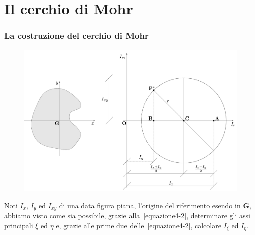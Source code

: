 \clearpage
\pagestyle{fancy}
\part{Il cerchio di Mohr}
\setcounter{section}{0}
\section{La costruzione del cerchio di Mohr}
\renewcommand{\thefigure}{5~-~1}
\begin{figure}[h]
\centering
\includegraphics[width=\textwidth]{Immagini/Parte_5/Figura5_1/Figura5_1.pdf}
\caption{}
\label{figura5-1}
\end{figure}
\noindent Noti $I_x$, $I_y$ ed $I_{xy}$ di una data figura piana, l'origine del riferimento esendo in $\mathbf{G}$, abbiamo visto come sia possibile, grazie alla~\eqref{equazione4-2}, determinare gli assi principali $\xi$ ed $\eta$ e, grazie alle prime due delle~\eqref{equazione4-2}, calcolare $I_{\xi}$ ed $I_{\eta}$. 

